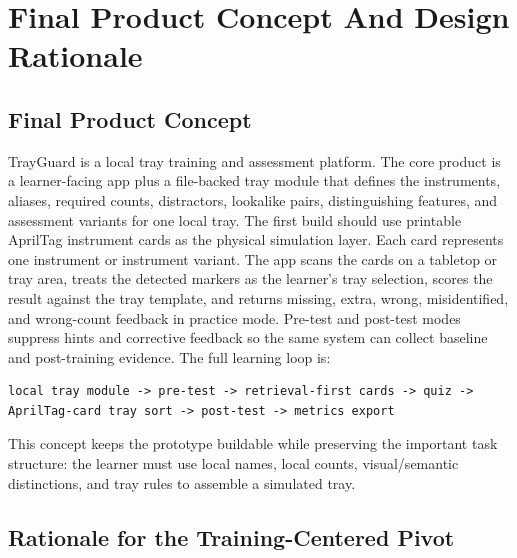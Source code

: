 \documentclass[10pt,a4paper]{article}
\begin{document}

\section{Final Product Concept And Design Rationale}
\label{sec:final-product-concept-and-design-rationale}
\subsection{Final Product Concept}


TrayGuard is a local tray training and assessment platform. The core product is
a learner-facing app plus a file-backed tray module that defines the
instruments, aliases, required counts, distractors, lookalike pairs,
distinguishing features, and assessment variants for one local tray.
The first build should use printable AprilTag instrument cards as the physical
simulation layer. Each card represents one instrument or instrument variant.
The app scans the cards on a tabletop or tray area, treats the detected markers
as the learner's tray selection, scores the result against the tray template,
and returns missing, extra, wrong, misidentified, and wrong-count feedback in
practice mode. Pre-test and post-test modes suppress hints and corrective
feedback so the same system can collect baseline and post-training evidence.
The full learning loop is:
\begin{lstlisting}
local tray module -> pre-test -> retrieval-first cards -> quiz -> AprilTag-card tray sort -> post-test -> metrics export
\end{lstlisting}
This concept keeps the prototype buildable while preserving the important task
structure: the learner must use local names, local counts, visual/semantic
distinctions, and tray rules to assemble a simulated tray.
\subsection{Rationale for the Training-Centered Pivot}
\end{document}
